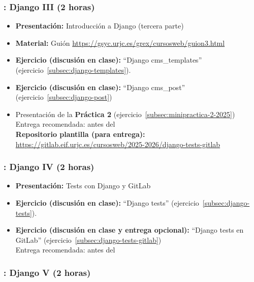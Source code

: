 \documentclass[a4paper,12pt]{article}
\begin{document}
\subsubsection{\juevesI: Django III (2 horas)}
\label{cal:juevesI}

\begin{itemize}
 \item \textbf{Presentación:} Introducción a Django (tercera parte)
  \item \textbf{Material:} Guión \url{https://gsyc.urjc.es/grex/cursosweb/guion3.html}
 \item \textbf{Ejercicio (discusión en clase):} ``Django cms\_templates'' (ejercicio~\ref{subsec:django-templates}).
 \item \textbf{Ejercicio (discusión en clase):} ``Django cms\_post'' (ejercicio~\ref{subsec:django-post}) \\
  \item Presentación de la \textbf{Práctica 2} (ejercicio~\ref{subsec:minipractica-2-2025}) \\
    Entrega recomendada: antes del \juevesK \\
    \textbf{Repositorio plantilla (para entrega):} \\
    \url{https://gitlab.eif.urjc.es/cursosweb/2025-2026/django-tests-gitlab}
\end{itemize}

\subsubsection{\juevesJ: Django IV (2 horas)}
\label{cal:juevesJ}

\begin{itemize}
\item \textbf{Presentación:} Tests con Django y GitLab
\item \textbf{Ejercicio (discusión en clase):} ``Django tests'' (ejercicio~\ref{subsec:django-tests}).
\item \textbf{Ejercicio (discusión en clase y entrega opcional):} ``Django tests en GitLab'' (ejercicio~\ref{subsec:django-tests-gitlab}) \\
  Entrega recomendada: antes del \juevesK
\end{itemize}


\subsubsection{\juevesK: Django V (2 horas)}
\label{cal:juevesK}
\end{document}
